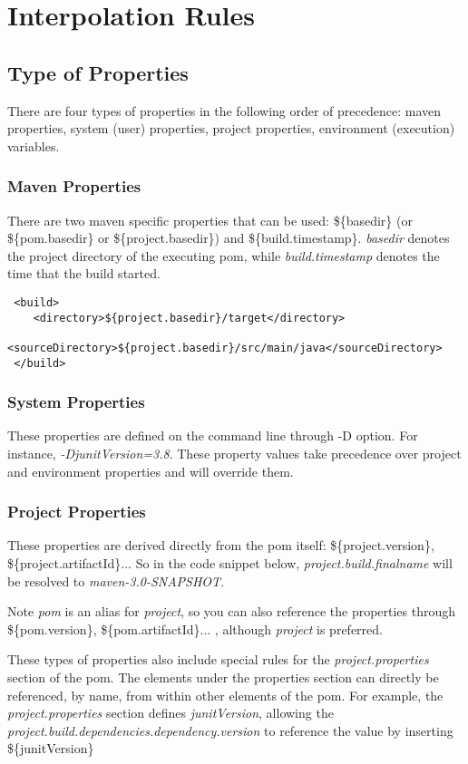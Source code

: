 \documentclass[12pt]{amsart}
\begin{document}
\section{Interpolation Rules}
\subsection{Type of Properties}
There are four types of properties in the following order of precedence: maven properties, system (user) properties, project properties, environment (execution) variables. 

\subsubsection{Maven Properties}
There are two maven specific properties that can be used: \$\{basedir\} (or \$\{pom.basedir\} or \$\{project.basedir\}) and \$\{build.timestamp\}. \emph{basedir} denotes the project directory of the executing pom, while\emph{ build.timestamp} denotes the time that the build started.

\begin{verbatim}
 <build>
    <directory>${project.basedir}/target</directory>
    <sourceDirectory>${project.basedir}/src/main/java</sourceDirectory>
 </build>
\end{verbatim}


\subsubsection{System Properties}
These properties are defined on the command line through -D option. For instance, \emph{-DjunitVersion=3.8}. These property values take precedence over project and environment properties and will override them.

\subsubsection{Project Properties}  These properties are derived directly from the pom itself: \$\{project.version\}, \$\{project.artifactId\}... So in the code snippet below, \emph{project.build.finalname} will be resolved to\emph{ maven-3.0-SNAPSHOT}. 

Note \emph{pom} is an alias for\emph{ project}, so you can also reference the properties through \$\{pom.version\}, \$\{pom.artifactId\}... , although \emph{project} is preferred.

These types of properties also include special rules for the \emph{project.properties }section of the pom. The elements under the properties section can directly be referenced, by name, from within other elements of the pom. For example, the \emph{project.properties }section defines \emph{junitVersion}, allowing the 
\emph{ project.build.dependencies.dependency.version} to reference the value by inserting \$\{junitVersion\}
\end{document}
